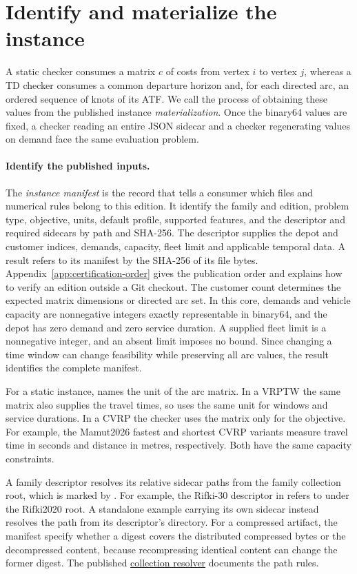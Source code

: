 \section{Identify and materialize the instance}\label{sec:materialization}

A static checker consumes a matrix $c$ of costs from vertex $i$ to vertex $j$, whereas a TD checker consumes a common departure horizon and, for each directed arc, an ordered sequence of knots of its ATF. We call the process of obtaining these values from the published instance \emph{materialization}. Once the binary64 values are fixed, a checker reading an entire JSON sidecar and a checker regenerating values on demand face the same evaluation problem.

\paragraph{Identify the published inputs.}
The \emph{instance manifest} is the record that tells a consumer which files and numerical rules belong to this edition. It \must{} identify the family and edition, problem type, objective, units, default profile, supported features, and the descriptor and required sidecars by path and SHA-256. The descriptor supplies the depot and customer indices, demands, capacity, fleet limit and applicable temporal data. A result refers to its manifest by the SHA-256 of its file bytes. Appendix~\ref{app:certification-order} gives the publication order and explains how to verify an edition outside a Git checkout. The customer count determines the expected matrix dimensions or directed arc set. In this core, demands and vehicle capacity are nonnegative integers exactly representable in binary64, and the depot has zero demand and zero service duration. A supplied fleet limit is a nonnegative integer, and an absent limit imposes no bound. Since changing a time window can change feasibility while preserving all arc values, the result identifies the complete manifest.

For a static instance,  names the unit of the arc matrix. In a VRPTW the same matrix also supplies the travel times, so  uses the same unit for windows and service durations. In a CVRP the checker uses the matrix only for the objective. For example, the Mamut2026 fastest and shortest CVRP variants measure travel time in seconds and distance in metres, respectively. Both have the same capacity constraints.

A family descriptor resolves its relative sidecar paths from the family collection root, which is marked by . For example, the Rifki-30 descriptor in  refers to  under the Rifki2020 root. A standalone example carrying its own sidecar instead resolves the path from its descriptor's directory. For a compressed artifact, the manifest \must{} specify whether a digest covers the distributed compressed bytes or the decompressed content, because recompressing identical content can change the former digest. The published \href{https://github.com/ANR-MAMUT/MAMUT-routing-lib/blob/e032f2b9b9d1ba16a561325a07ab59cf39f8e5d5/src/mamut_routing_lib/sidecars.py}{collection resolver} documents the path rules.

